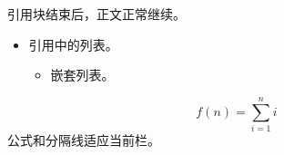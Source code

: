 \documentclass{article}
\begin{document}
引用块结束后，正文正常继续。
\begin{quoteblock}
\begin{itemize}\item 引用中的列表。\begin{itemize}\item 嵌套列表。\end{itemize}\end{itemize}
\[ f(n)=\sum_{i=1}^{n}i \]
\Separator{}
公式和分隔线适应当前栏。
\end{quoteblock}
\end{document}

